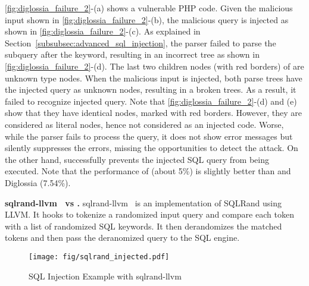 {\autoref{fig:diglossia_failure_2}-(a) shows a vulnerable PHP code.
Given the malicious input shown in \autoref{fig:diglossia_failure_2}-(b), the malicious query is injected as shown in \autoref{fig:diglossia_failure_2}-(c).
%
As explained in Section~\ref{subsubsec:advanced_sql_injection}, the parser failed to parse the subquery after the  keyword, resulting in an incorrect tree as shown in \autoref{fig:diglossia_failure_2}-(d). 
The last two children nodes (with red borders) of  are unknown type nodes. 
When the malicious input is injected, both parse trees have the injected query as unknown nodes, resulting in a broken trees. As a result, it failed to recognize injected query. 
Note that \autoref{fig:diglossia_failure_2}-(d) and (e) show that they have identical nodes, marked with red borders. However, they are considered as literal nodes, hence not considered as an injected code. 
Worse, while the parser fails to process the query, it does not show error messages but silently suppresses the errors, missing the opportunities to detect the attack.
On the other hand, \sysname successfully prevents the injected SQL query  from being executed.
Note that the performance of \sysname (about 5\%) is slightly better than and Diglossia (7.54\%).


\noindent
\textbf{sqlrand-llvm~\cite{sqlrand-llvm} vs \sysname.}
sqlrand-llvm~\cite{sqlrand-llvm} is an implementation of SQLRand using LLVM. %
It hooks  to tokenize a randomized input query and compare each token with a list of randomized SQL keywords. %
It then derandomizes the matched tokens and then pass the deranomized query to the SQL engine. 


\begin{figure}[ht]
    \centering
    \texttt{[image: fig/sqlrand\_injected.pdf]}
    \vspace{-1em}
     \caption{SQL Injection Example with sqlrand-llvm~\cite{sqlrand-llvm}}
     \vspace{-1em}
     \label{fig:sqlrand-injected}
\end{figure}


}
